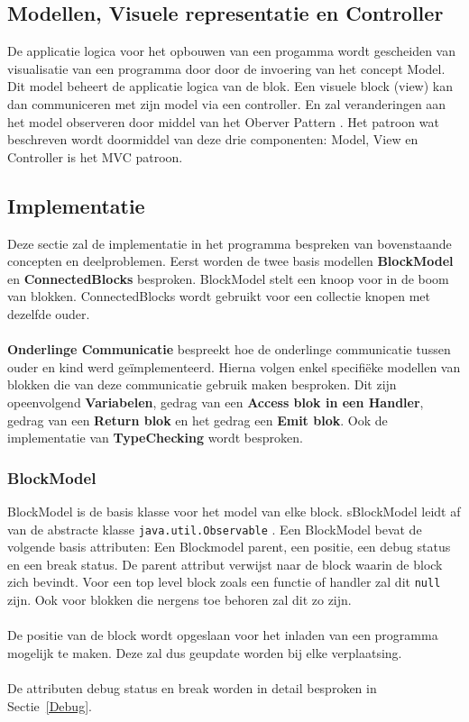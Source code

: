 \documentclass[]{article}
\begin{document}
\subsection{Modellen, Visuele representatie en Controller}
De applicatie logica voor het opbouwen van een progamma wordt gescheiden van 
visualisatie van een programma door door de invoering van  het concept Model. Dit model beheert de applicatie logica van de blok. Een visuele block (view) kan dan communiceren met zijn model via een controller. En zal veranderingen aan het model observeren door middel van het Oberver Pattern \cite{Observer_pattern}. Het patroon wat beschreven wordt doormiddel van deze drie componenten: Model, View en Controller is het MVC patroon.

\subsection{Implementatie}
Deze sectie zal de implementatie in het programma bespreken van bovenstaande concepten en deelproblemen. Eerst worden de twee basis modellen \textbf{BlockModel} en  \textbf{ConnectedBlocks} besproken.  BlockModel stelt een knoop voor in de boom van blokken. ConnectedBlocks wordt gebruikt voor een collectie knopen met dezelfde ouder.\\\\
\textbf{Onderlinge Communicatie} bespreekt hoe de onderlinge communicatie tussen ouder en kind werd ge\"{i}mplementeerd. Hierna volgen enkel specifi\"{e}ke modellen van blokken die van deze communicatie gebruik maken besproken. Dit zijn opeenvolgend \textbf{Variabelen}, gedrag van een  \textbf{Access blok in een Handler}, gedrag van een \textbf{Return blok} en het gedrag een \textbf{Emit blok}. Ook de implementatie van \textbf{TypeChecking}  wordt besproken.

\subsubsection{BlockModel}
\label{BlockModel}
BlockModel is de basis klasse voor het model van elke block. sBlockModel leidt af van de abstracte klasse \texttt{java.util.Observable} \cite{Observable}. Een BlockModel bevat de volgende basis attributen: Een Blockmodel parent, een positie, een debug status en een break status. De parent attribut verwijst naar de block waarin de block zich bevindt. Voor een top level block zoals een functie of handler zal dit \texttt{null} zijn. Ook voor blokken die nergens toe behoren zal dit zo zijn.\\\\
De positie van de block wordt opgeslaan voor het inladen van een programma mogelijk te maken. Deze zal dus geupdate worden bij elke verplaatsing.\\\\
De attributen debug status en break worden in detail besproken in Sectie~\ref{Debug}.
\end{document}
